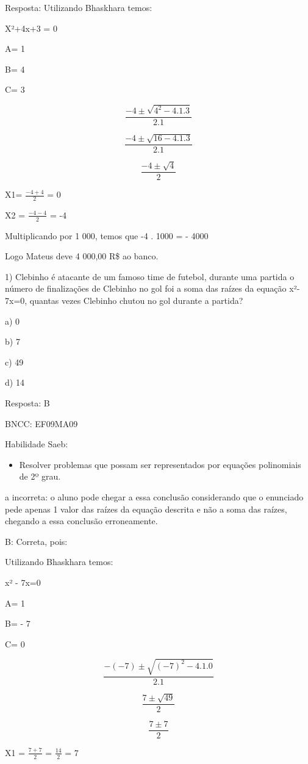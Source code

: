 {Resposta: Utilizando Bhaskhara temos:

X²+4x+3 = 0

A= 1

B= 4

C= 3

\[\frac{- 4 \pm \sqrt{4^{2} - 4.1.3}}{2.1}\]

\[\frac{- 4 \pm \sqrt{16 - 4.1.3}}{2.1}\]

\[\frac{- 4 \pm \sqrt{4}}{2}\]

X1= \(\frac{- 4 + 4}{2}\) = 0

X2 = \(\frac{- 4 - 4}{2}\) = -4

Multiplicando por 1 000, temos que -4 . 1000 = - 4000

Logo Mateus deve 4 000,00 R\$ ao banco.


1) Clebinho é atacante de um famoso time de futebol, durante uma partida
o número de finalizações de Clebinho no gol foi a soma das raízes da
equação x²- 7x=0, quantas vezes Clebinho chutou no gol durante a
partida?

a) 0

b) 7

c) 49

d) 14

Resposta: B

BNCC: EF09MA09

Habilidade Saeb:

\begin{itemize}
\tightlist
\item
  Resolver problemas que possam ser representados por equações
  polinomiais de 2º grau.
\end{itemize}

a incorreta: o aluno pode chegar a essa conclusão considerando que o
enunciado pede apenas 1 valor das raízes da equação descrita e não a
soma das raízes, chegando a essa conclusão erroneamente.

B: Correta, pois:

Utilizando Bhaskhara temos:

x² - 7x=0

A= 1

B= - 7

C= 0

\[\frac{- ( - 7) \pm \sqrt{{( - 7)}^{2} - 4.1.0}}{2.1}\]

\[\frac{7 \pm \sqrt{49}}{2}\]

\[\frac{7 \pm 7}{2}\]

X1 = \(\frac{7 + 7}{2}\) = \(\frac{14}{2}\) = 7

}
